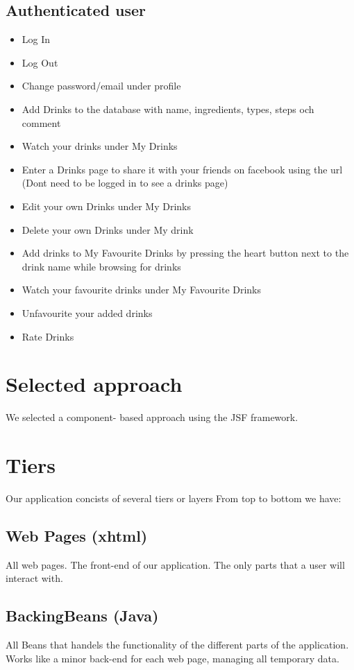 \documentclass[a4paper]{article}
\begin{document}
\subsection{Authenticated user}

\begin{itemize}
\item Log In
\item Log Out
\item Change password/email under profile
\item Add Drinks to the database with name, ingredients, types, steps och comment
\item Watch your drinks under My Drinks
\item Enter a Drinks page to share it with your friends on facebook using the url (Dont need to be logged in to see a drinks page)
\item Edit your own Drinks under My Drinks
\item Delete your own Drinks under My drink
\item Add drinks to My Favourite Drinks by pressing the heart button next to the drink name while browsing for drinks
\item Watch your favourite drinks under My Favourite Drinks
\item Unfavourite your added drinks
\item Rate Drinks
\end{itemize}

\section{Selected approach}
We selected a component- based approach using the JSF framework.

\section{Tiers}
Our application concists of several tiers or layers
From top to bottom we have:

\subsection{Web Pages (xhtml)}
All web pages. The front-end of our application. The only parts that a user will interact with.
\subsection{BackingBeans (Java)}
All Beans that handels the functionality of the different parts of the application. Works like a minor back-end for each web page, managing all temporary data.
\end{document}
